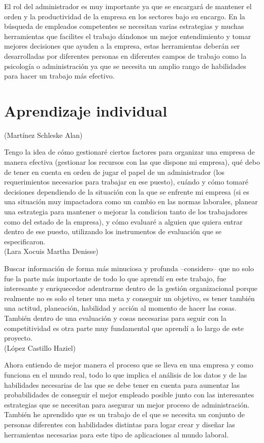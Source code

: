 \documentclass[letterpaper,12pt]{article}
\begin{document}
\begin{sloppypar}
El rol del administrador es muy importante ya que se encargará de mantener el orden y la productividad de la empresa en los sectores bajo su encargo. En la búsqueda de empleados competentes se necesitan varias estrategias y muchas herramientas que facilites el trabajo dándonos un mejor entendimiento y tomar mejores decisiones que ayuden a la empresa, estas herramientas deberán ser desarrolladas por diferentes personas en diferentes campos de trabajo como la psicología o administración ya que se necesita un amplio rango de habilidades para hacer un trabajo más efectivo.

\newpage
\section{\textcolor[rgb]{0.4,0.4,0.9}{Aprendizaje individual}}

\noindent (Martínez Schleske Alan)

Tengo la idea de cómo gestionaré ciertos factores para organizar una empresa de manera efectiva (gestionar los recursos con las que dispone mi empresa), qué debo de tener en cuenta en orden de jugar el papel de un administrador (los requerimientos necesarios para trabajar en ese puesto), cuándo y cómo tomaré decisiones dependiendo de la situación con la que se enfrente mi empresa (si es una situación muy impactadora como un cambio en las normas laborales, planear una estrategia para mantener o mejorar la condicion tanto de los trabajadores como del estado de la empresa), y cómo evaluaré a alguien que quiera entrar dentro de ese puesto, utilizando los instrumentos de evaluación que se especificaron.
\vspace{0.3cm}\\
(Lara Xocuis Martha Denisse)

Buscar información de forma más minuciosa y profunda --considero-- que no solo fue la parte más importante de todo lo que aprendí en este trabajo, fue interesante y enriquecedor adentrarme dentro de la gestión organizacional porque realmente no es solo el tener una meta y conseguir un objetivo, es tener también una actitud, planeación, habilidad y acción al momento de hacer las cosas. También dentro de una evaluación y cosas necesarias para seguir con la competitividad es otra parte muy fundamental que aprendí a lo largo de este proyecto.
\vspace{0.3cm}\\
(López Castillo Haziel)

Ahora entiendo de mejor manera el proceso que se lleva en una empresa y como funciona en el mundo real, todo lo que implica el análisis de los datos y de las habilidades necesarias de las que se debe tener en cuenta para aumentar las probabilidades de conseguir el mejor empleado posible junto con las interesantes estrategias que se necesitan para asegurar un mejor proceso de administración. También he aprendido que es un trabajo de el que se necesita un conjunto de personas diferentes con habilidades distintas para logar crear y diseñar las herramientas necesarias para este tipo de aplicaciones al mundo laboral.




\end{sloppypar}
\end{document}
